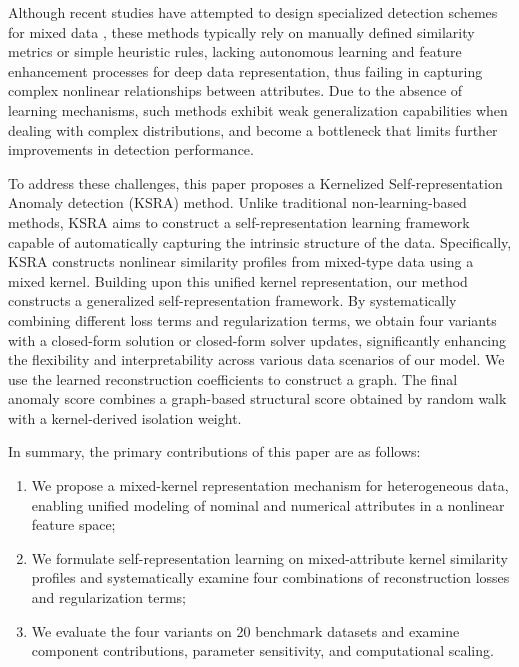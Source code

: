 \documentclass[ASNA,twocolumn]{USG} %
\begin{document}
Although recent studies have attempted to design specialized detection schemes for mixed data \cite{yuan2023anomaly}, these methods typically rely on manually defined similarity metrics or simple heuristic rules, lacking autonomous learning and feature enhancement processes for deep data representation, thus failing in capturing complex nonlinear relationships between attributes. Due to the absence of learning mechanisms, such methods exhibit weak generalization capabilities when dealing with complex distributions, and become a bottleneck that limits further improvements in detection performance.

To address these challenges, this paper proposes a Kernelized Self-representation Anomaly detection (KSRA) method. Unlike traditional non-learning-based methods, KSRA aims to construct a self-representation learning framework capable of automatically capturing the intrinsic structure of the data.
Specifically, KSRA constructs nonlinear similarity profiles from mixed-type data using a mixed kernel. Building upon this unified kernel representation, our method constructs a generalized self-representation framework. By systematically combining different loss terms and regularization terms, we obtain four variants with a closed-form solution or closed-form solver updates, significantly enhancing the flexibility and interpretability across various data scenarios of our model. We use the learned reconstruction coefficients to construct a graph. The final anomaly score combines a graph-based structural score obtained by random walk with a kernel-derived isolation weight.

In summary, the primary contributions of this paper are as follows:
\begin{enumerate}[\indent (1)]
    \item We propose a mixed-kernel representation mechanism for heterogeneous data, enabling unified modeling of nominal and numerical attributes in a nonlinear feature space;

    \item We formulate self-representation learning on mixed-attribute kernel similarity profiles and systematically examine four combinations of reconstruction losses and regularization terms;

    \item We evaluate the four variants on 20 benchmark datasets and examine component contributions, parameter sensitivity, and computational scaling.
\end{enumerate}
\end{document}
